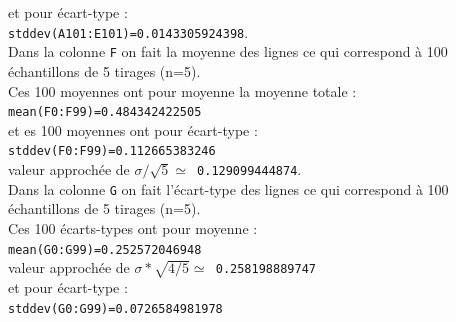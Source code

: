 \documentclass[a4paper,11pt]{book}
\begin{document}
et pour \'ecart-type : \\
{\tt stddev(A101:E101)=0.0143305924398}.\\
Dans la colonne {\tt F} on fait la moyenne des lignes ce qui correspond \`a 
100 \'echantillons de 5 tirages (n=5).\\
Ces 100 moyennes ont pour moyenne la moyenne totale :\\ 
{\tt mean(F0:F99)=0.484342422505} \\
et es 100 moyennes ont pour \'ecart-type :\\ 
{\tt stddev(F0:F99)=0.112665383246}\\
valeur approch\'ee de  {\tt $\sigma/\sqrt 5 \simeq$ 0.129099444874}.\\
Dans la colonne {\tt G} on fait l'\'ecart-type des lignes ce qui correspond 
\`a 100 \'echantillons de 5 tirages (n=5).\\
Ces 100 \'ecarts-types ont pour moyenne : \\
{\tt mean(G0:G99)=0.252572046948}\\
valeur approch\'ee de  {\tt $\sigma*\sqrt{4/ 5} \simeq$ 0.258198889747} \\
et pour \'ecart-type :\\
 {\tt stddev(G0:G99)=0.0726584981978}\\
\end{document}
